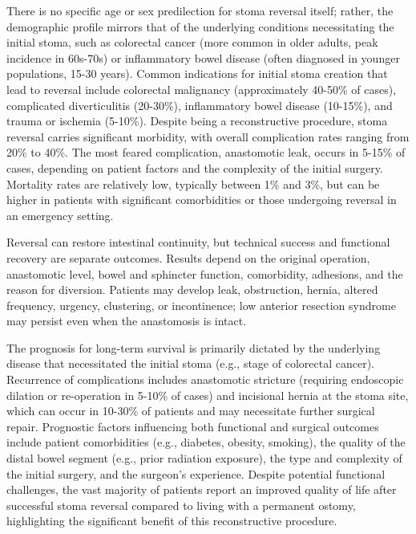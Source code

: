 There is no specific age or sex predilection for stoma reversal itself; rather, the demographic profile mirrors that of the underlying conditions necessitating the initial stoma, such as colorectal cancer (more common in older adults, peak incidence in 60s-70s) or inflammatory bowel disease (often diagnosed in younger populations, 15-30 years). Common indications for initial stoma creation that lead to reversal include colorectal malignancy (approximately 40-50\% of cases), complicated diverticulitis (20-30\%), inflammatory bowel disease (10-15\%), and trauma or ischemia (5-10\%). Despite being a reconstructive procedure, stoma reversal carries significant morbidity, with overall complication rates ranging from 20\% to 40\%. The most feared complication, anastomotic leak, occurs in 5-15\% of cases, depending on patient factors and the complexity of the initial surgery. Mortality rates are relatively low, typically between 1\% and 3\%, but can be higher in patients with significant comorbidities or those undergoing reversal in an emergency setting.

Reversal can restore intestinal continuity, but technical success and functional recovery are separate outcomes. Results depend on the original operation, anastomotic level, bowel and sphincter function, comorbidity, adhesions, and the reason for diversion. Patients may develop leak, obstruction, hernia, altered frequency, urgency, clustering, or incontinence; low anterior resection syndrome may persist even when the anastomosis is intact.

The prognosis for long-term survival is primarily dictated by the underlying disease that necessitated the initial stoma (e.g., stage of colorectal cancer). Recurrence of complications includes anastomotic stricture (requiring endoscopic dilation or re-operation in 5-10\% of cases) and incisional hernia at the stoma site, which can occur in 10-30\% of patients and may necessitate further surgical repair. Prognostic factors influencing both functional and surgical outcomes include patient comorbidities (e.g., diabetes, obesity, smoking), the quality of the distal bowel segment (e.g., prior radiation exposure), the type and complexity of the initial surgery, and the surgeon's experience. Despite potential functional challenges, the vast majority of patients report an improved quality of life after successful stoma reversal compared to living with a permanent ostomy, highlighting the significant benefit of this reconstructive procedure.


